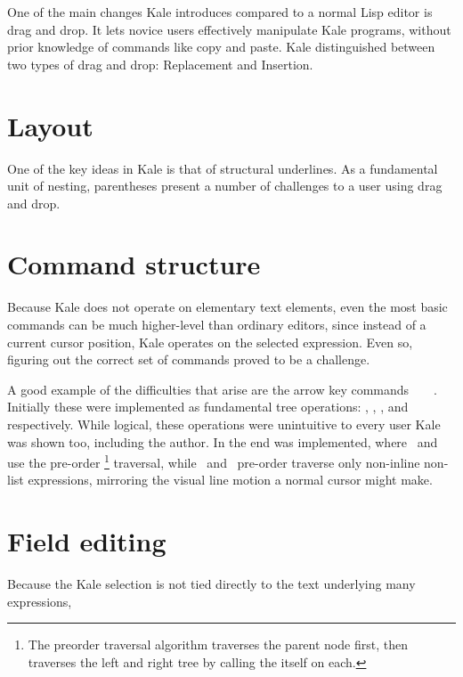 One of the main changes Kale introduces compared to a normal Lisp editor is
drag and drop. It lets novice users effectively manipulate Kale programs,
without prior knowledge of commands like copy and paste. Kale distinguished
between two types of drag and drop: Replacement and Insertion. 

\section{Layout}

One of the key ideas in Kale is that of structural underlines. As a
fundamental unit of nesting, parentheses present a number of challenges to a
user using drag and drop.

\section{Command structure}

Because Kale does not operate on elementary text elements, even the most
basic
commands can be much higher-level than ordinary editors, since instead of a
current cursor position, Kale operates on the selected expression. Even so,
figuring out the correct set of commands proved to be a challenge.

A good example of the difficulties that arise are the arrow key
commands~\ak{^}~~\ak{<}~\ak{>}. Initially these were implemented as
fundamental tree operations: , ,
, and  respectively.
While logical, these operations were unintuitive to every user
Kale was shown too, including the author. In the end  was
implemented, where~\ak{<} and~\ak{>} use the pre-order%
%
\footnote{The preorder traversal algorithm traverses the parent node first,
then traverses the left and right tree by calling the itself on each.}
%
traversal, while~\ak{^} and~
pre-order traverse only non-inline non-list expressions, mirroring the visual
line motion a normal cursor might make.

\section{Field editing}
\label{soln:field_editing}

Because the Kale selection is not tied directly to the text underlying many
expressions, 

